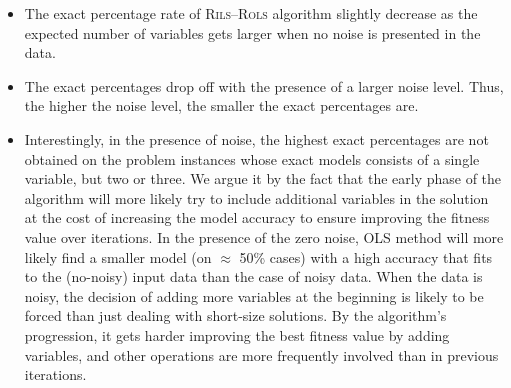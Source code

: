 \documentclass[a4paper,12pt]{elsarticle}
\begin{document}
\begin{itemize}
	\item The exact percentage rate of \textsc{Rils}--\textsc{Rols} algorithm  slightly decrease as the expected number of variables gets larger when no noise is presented in the data.
	\item The exact percentages drop off with the presence of a larger noise level. Thus, the higher the noise level, the smaller the exact percentages are.
	\item Interestingly, in the presence of noise, the highest exact percentages are not obtained on the problem instances whose exact models consists of a single variable, but two or three. We argue it by the fact that the early phase of the algorithm will more likely try to include additional variables in the solution at the cost of increasing the model accuracy to ensure improving the fitness value over iterations. In the presence of the zero noise, OLS method will more likely find a smaller model (on $\approx$ 50\% cases) with a high accuracy that fits to the (no-noisy) input data than the case of noisy data. When the data is noisy, the decision of adding more variables at the beginning is likely to be forced than just dealing with short-size solutions. By the algorithm's progression, it gets harder improving the best fitness value by adding variables, and other operations are more frequently involved than in previous iterations. %
\end{itemize}
\end{document}
